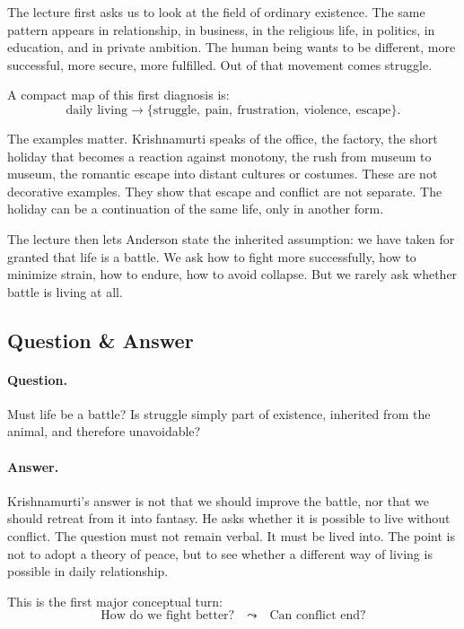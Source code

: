 The lecture first asks us to look at the field of ordinary existence. The same pattern appears in relationship, in business, in the religious life, in politics, in education, and in private ambition. The human being wants to be different, more successful, more secure, more fulfilled. Out of that movement comes struggle.

A compact map of this first diagnosis is:
\begin{equation}
\text{daily living}
   \longrightarrow
\{\text{struggle},\ \text{pain},\ \text{frustration},\ \text{violence},\ \text{escape}\}.
\end{equation}

The examples matter. Krishnamurti speaks of the office, the factory, the short holiday that becomes a reaction against monotony, the rush from museum to museum, the romantic escape into distant cultures or costumes. These are not decorative examples. They show that escape and conflict are not separate. The holiday can be a continuation of the same life, only in another form.

The lecture then lets Anderson state the inherited assumption: we have taken for granted that life is a battle. We ask how to fight more successfully, how to minimize strain, how to endure, how to avoid collapse. But we rarely ask whether battle is living at all.

\subsection{Question \& Answer}

\paragraph{Question.}
Must life be a battle? Is struggle simply part of existence, inherited from the animal, and therefore unavoidable?

\paragraph{Answer.}
Krishnamurti's answer is not that we should improve the battle, nor that we should retreat from it into fantasy. He asks whether it is possible to live without conflict. The question must not remain verbal. It must be lived into. The point is not to adopt a theory of peace, but to see whether a different way of living is possible in daily relationship.

This is the first major conceptual turn:
\begin{equation}
\text{How do we fight better?}
\quad \leadsto \quad
\text{Can conflict end?}
\end{equation}

